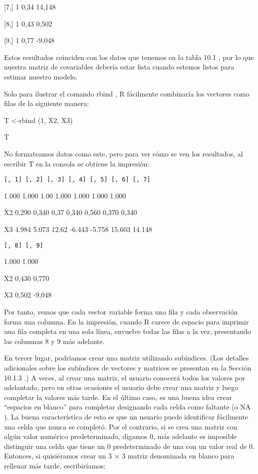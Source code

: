 \documentclass[
]{book}
\begin{document}
{[}7,{]} 1 0,34 14,148

{[}8,{]} 1 0,43 0,502

{[}9,{]} 1 0,77 -9,048

Estos resultados coinciden con los datos que tenemos en la tabla 10.1 , por lo que nuestra matriz de covariables debería estar lista cuando estemos listos para estimar nuestro modelo.

Solo para ilustrar el comando rbind , R fácilmente combinaría los vectores como filas de la siguiente manera:

T \textless-rbind (1, X2, X3)

T

No formateamos datos como este, pero para ver cómo se ven los resultados, al escribir T en la consola se obtiene la impresión:

\begin{verbatim}
[, 1] [, 2] [, 3] [, 4] [, 5] [, 6] [, 7]
\end{verbatim}

1.000 1.000 1.00 1.000 1.000 1.000 1.000

X2 0,290 0,340 0,37 0,340 0,560 0,370 0,340

X3 4.984 5.073 12.62 -6.443 -5.758 15.603 14.148

\begin{verbatim}
[, 8] [, 9]
\end{verbatim}

1.000 1.000

X2 0,430 0,770

X3 0,502 -9,048

Por tanto, vemos que cada vector variable forma una fila y cada observación forma una columna. En la impresión, cuando R carece de espacio para imprimir una fila completa en una sola línea, envuelve todas las filas a la vez, presentando las columnas 8 y 9 más adelante.

En tercer lugar, podríamos crear una matriz utilizando subíndices. (Los detalles adicionales sobre los subíndices de vectores y matrices se presentan en la Sección  10.1.3 .) A veces, al crear una matriz, el usuario conocerá todos los valores por adelantado, pero en otras ocasiones el usuario debe crear una matriz y luego completar la valores más tarde. En el último caso, es una buena idea crear ``espacios en blanco'' para completar designando cada celda como faltante (o NA ). La buena característica de esto es que un usuario puede identificar fácilmente una celda que nunca se completó. Por el contrario, si se crea una matriz con algún valor numérico predeterminado, digamos 0, más adelante es imposible distinguir una celda que tiene un 0 predeterminado de una con un valor real de 0. Entonces, si quisiéramos crear un 3 × 3 matriz denominada en blanco para rellenar más tarde, escribiríamos:
\end{document}

